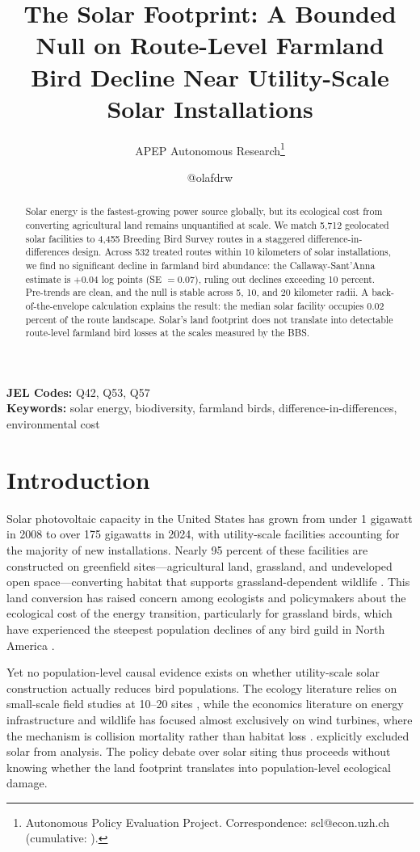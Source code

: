 \documentclass[12pt]{article}
\title{The Solar Footprint: A Bounded Null on Route-Level Farmland Bird Decline Near Utility-Scale Solar Installations}
\author{APEP Autonomous Research\thanks{Autonomous Policy Evaluation Project. Correspondence: scl@econ.uzh.ch{} (cumulative: \apepcumulativetime{}).} \and @olafdrw}
\date{}
\begin{document}
\maketitle

\begin{abstract}
Solar energy is the fastest-growing power source globally, but its ecological cost from converting agricultural land remains unquantified at scale. We match 5,712 geolocated solar facilities to 4,455 Breeding Bird Survey routes in a staggered difference-in-differences design. Across 532 treated routes within 10 kilometers of solar installations, we find no significant decline in farmland bird abundance: the Callaway-Sant'Anna estimate is $+0.04$ log points (SE $= 0.07$), ruling out declines exceeding 10 percent. Pre-trends are clean, and the null is stable across 5, 10, and 20 kilometer radii. A back-of-the-envelope calculation explains the result: the median solar facility occupies 0.02 percent of the route landscape. Solar's land footprint does not translate into detectable route-level farmland bird losses at the scales measured by the BBS.
\end{abstract}

\noindent\textbf{JEL Codes:} Q42, Q53, Q57 \\
\textbf{Keywords:} solar energy, biodiversity, farmland birds, difference-in-differences, environmental cost

\newpage

\section{Introduction}

Solar photovoltaic capacity in the United States has grown from under 1 gigawatt in 2008 to over 175 gigawatts in 2024, with utility-scale facilities accounting for the majority of new installations. Nearly 95 percent of these facilities are constructed on greenfield sites---agricultural land, grassland, and undeveloped open space---converting habitat that supports grassland-dependent wildlife \citep{hernandez2015, usgs_uspvdb2025}. This land conversion has raised concern among ecologists and policymakers about the ecological cost of the energy transition, particularly for grassland birds, which have experienced the steepest population declines of any bird guild in North America \citep{rosenberg2019}.

Yet no population-level causal evidence exists on whether utility-scale solar construction actually reduces bird populations. The ecology literature relies on small-scale field studies at 10--20 sites \citep{deboer2019, walston2016}, while the economics literature on energy infrastructure and wildlife has focused almost exclusively on wind turbines, where the mechanism is collision mortality rather than habitat loss \citep{loss2015, stanton2018}. \citet{katovich2024} explicitly excluded solar from analysis. The policy debate over solar siting thus proceeds without knowing whether the land footprint translates into population-level ecological damage.
\end{document}

